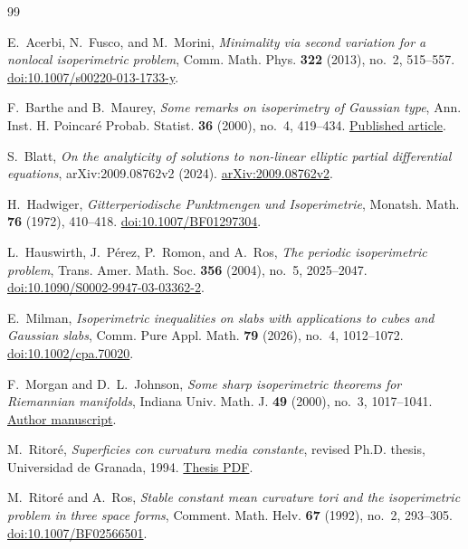\begingroup\small
\begin{thebibliography}{99}

E.~Acerbi, N.~Fusco, and M.~Morini,
\emph{Minimality via second variation for a nonlocal isoperimetric problem},
Comm. Math. Phys. \textbf{322} (2013), no.~2, 515--557.
\href{https://doi.org/10.1007/s00220-013-1733-y}{doi:10.1007/s00220-013-1733-y}.

F.~Barthe and B.~Maurey,
\emph{Some remarks on isoperimetry of Gaussian type},
Ann. Inst. H. Poincar\'e Probab. Statist. \textbf{36} (2000), no.~4, 419--434.
\href{https://www.numdam.org/item/AIHPB_2000__36_4_419_0/}{Published article}.

S.~Blatt,
\emph{On the analyticity of solutions to non-linear elliptic partial differential equations},
arXiv:2009.08762v2 (2024).
\href{https://arxiv.org/abs/2009.08762v2}{arXiv:2009.08762v2}.

H.~Hadwiger,
\emph{Gitterperiodische Punktmengen und Isoperimetrie},
Monatsh. Math. \textbf{76} (1972), 410--418.
\href{https://doi.org/10.1007/BF01297304}{doi:10.1007/BF01297304}.

L.~Hauswirth, J.~P\'erez, P.~Romon, and A.~Ros,
\emph{The periodic isoperimetric problem},
Trans. Amer. Math. Soc. \textbf{356} (2004), no.~5, 2025--2047.
\href{https://doi.org/10.1090/S0002-9947-03-03362-2}{doi:10.1090/S0002-9947-03-03362-2}.

E.~Milman,
\emph{Isoperimetric inequalities on slabs with applications to cubes and Gaussian slabs},
Comm. Pure Appl. Math. \textbf{79} (2026), no.~4, 1012--1072.
\href{https://doi.org/10.1002/cpa.70020}{doi:10.1002/cpa.70020}.

F.~Morgan and D.~L.~Johnson,
\emph{Some sharp isoperimetric theorems for Riemannian manifolds},
Indiana Univ. Math. J. \textbf{49} (2000), no.~3, 1017--1041.
\href{https://www.lehigh.edu/~dlj0/papers/morgan-johnson.pdf}{Author manuscript}.

M.~Ritor\'e,
\emph{Superficies con curvatura media constante},
revised Ph.D. thesis, Universidad de Granada, 1994.
\href{https://www.ugr.es/~ritore/preprints/tesis.pdf}{Thesis PDF}.

M.~Ritor\'e and A.~Ros,
\emph{Stable constant mean curvature tori and the isoperimetric problem in three space forms},
Comment. Math. Helv. \textbf{67} (1992), no.~2, 293--305.
\href{https://doi.org/10.1007/BF02566501}{doi:10.1007/BF02566501}.


\end{thebibliography}
